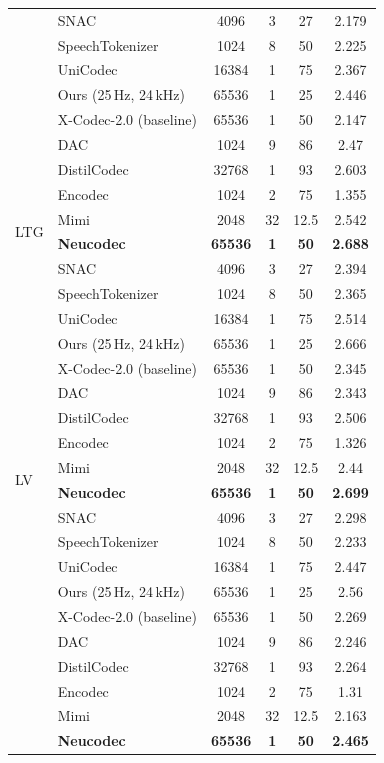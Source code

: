 \documentclass[preprint]{article}
\begin{document}
\begin{longtable}{llcccc}
  & SNAC & 4096 & 3 & 27 & 2.179 \\
  & SpeechTokenizer & 1024 & 8 & 50 & 2.225 \\
  & UniCodec & 16384 & 1 & 75 & 2.367 \\
  & Ours (25\,Hz, 24\,kHz) & 65536 & 1 & 25 & 2.446 \\
  & X-Codec-2.0 (baseline) & 65536 & 1 & 50 & 2.147 \\
\midrule
\multirow{8}{*}{LTG}
  & DAC & 1024 & 9 & 86 & 2.47 \\
  & DistilCodec & 32768 & 1 & 93 & 2.603 \\
  & Encodec & 1024 & 2 & 75 & 1.355 \\
  & Mimi & 2048 & 32 & 12.5 & 2.542 \\
  & \textbf{Neucodec} & \textbf{65536} & \textbf{1} & \textbf{50} & \textbf{2.688} \\
  & SNAC & 4096 & 3 & 27 & 2.394 \\
  & SpeechTokenizer & 1024 & 8 & 50 & 2.365 \\
  & UniCodec & 16384 & 1 & 75 & 2.514 \\
  & Ours (25\,Hz, 24\,kHz) & 65536 & 1 & 25 & 2.666 \\
  & X-Codec-2.0 (baseline) & 65536 & 1 & 50 & 2.345 \\
\midrule
\multirow{8}{*}{LV}
  & DAC & 1024 & 9 & 86 & 2.343 \\
  & DistilCodec & 32768 & 1 & 93 & 2.506 \\
  & Encodec & 1024 & 2 & 75 & 1.326 \\
  & Mimi & 2048 & 32 & 12.5 & 2.44 \\
  & \textbf{Neucodec} & \textbf{65536} & \textbf{1} & \textbf{50} & \textbf{2.699} \\
  & SNAC & 4096 & 3 & 27 & 2.298 \\
  & SpeechTokenizer & 1024 & 8 & 50 & 2.233 \\
  & UniCodec & 16384 & 1 & 75 & 2.447 \\
  & Ours (25\,Hz, 24\,kHz) & 65536 & 1 & 25 & 2.56 \\
  & X-Codec-2.0 (baseline) & 65536 & 1 & 50 & 2.269 \\
\newpage
\multirow{8}{*}{MDF}
  & DAC & 1024 & 9 & 86 & 2.246 \\
  & DistilCodec & 32768 & 1 & 93 & 2.264 \\
  & Encodec & 1024 & 2 & 75 & 1.31 \\
  & Mimi & 2048 & 32 & 12.5 & 2.163 \\
  & \textbf{Neucodec} & \textbf{65536} & \textbf{1} & \textbf{50} & \textbf{2.465} \\

\end{longtable}
\end{document}
